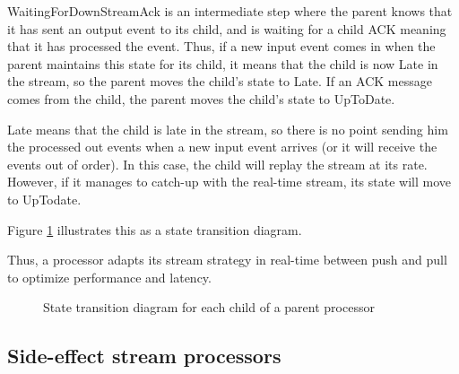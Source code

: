 WaitingForDownStreamAck is an intermediate step where the parent knows that it has sent an output event to its child, and is waiting for a child ACK meaning that it has
processed the event. Thus, if a new input event comes in when the parent maintains this state
for its child, it means that the child is now Late in the stream, so the parent moves the child's state to Late. If an ACK message comes from the child, the parent moves the
child's state to UpToDate.

Late means that the child is late in the stream, so there is no point sending him the processed out events when a new input event arrives (or it will receive the events out of order).
In this case, the child will replay the stream at its rate. However, if it manages to catch-up with the real-time stream, its state will move to UpTodate.

Figure \ref{fig:childstates} illustrates this as a state transition diagram.

Thus, a processor adapts its stream strategy in real-time between push and pull to optimize performance and latency.

\begin{figure}[h]
  \begin{center} 
    \caption{State transition diagram for each child of a parent processor}
    \label{fig:childstates}
  \end{center}
\end{figure}

\subsection{Side-effect stream processors}
\label{sec:sideeffectproc}

